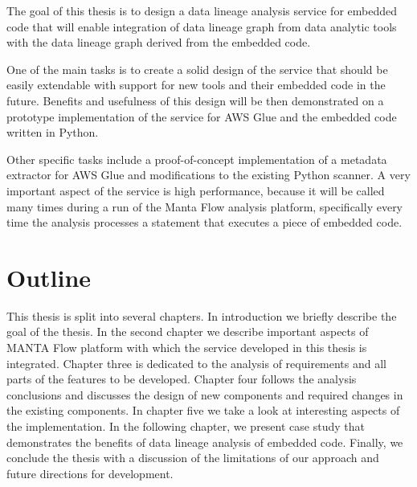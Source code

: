 The goal of this thesis is to design a data lineage analysis service for embedded code that will enable integration of data lineage graph from data analytic tools with the data lineage graph derived from the embedded code.
\par
One of the main tasks is to create a solid design of the service that should be easily extendable with support for new tools and their embedded code in the future. Benefits and usefulness of this design will be then demonstrated on a prototype implementation of the service for AWS Glue and the embedded code written in Python.
\par
Other specific tasks include a proof-of-concept implementation of a metadata extractor for AWS Glue and modifications to the existing Python scanner. A very important aspect of the service is high performance, because it will be called many times during a run of the Manta Flow analysis platform, specifically every time the analysis processes a statement that executes a piece of embedded code.

\section{Outline}

This thesis is split into several chapters. In introduction we briefly describe the goal of the thesis. In the second chapter we describe important aspects of MANTA Flow platform with which the service developed in this thesis is integrated. Chapter three is dedicated to the analysis of requirements and all parts of the features to be developed. Chapter four follows the analysis conclusions and discusses the design of new components and required changes in the existing components. In chapter five we take a look at interesting aspects of the implementation. In the following chapter, we present case study that demonstrates the benefits of data lineage analysis of embedded code. Finally, we conclude the thesis with a discussion of the limitations of our approach and future directions for development.
